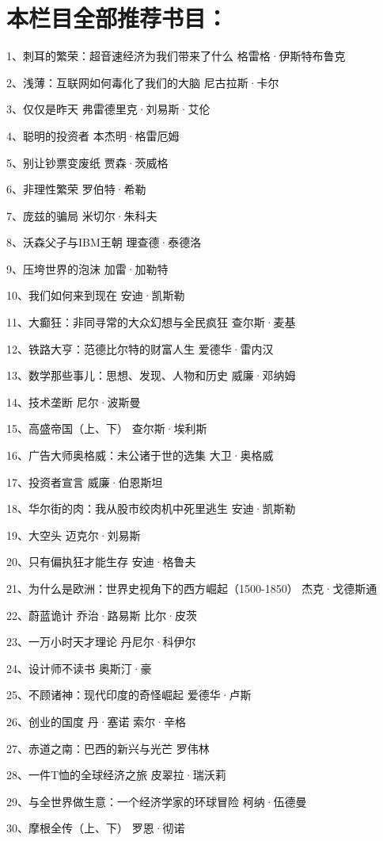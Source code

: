 \section{本栏目全部推荐书目：}

1、刺耳的繁荣：超音速经济为我们带来了什么 格雷格·伊斯特布鲁克

2、浅薄：互联网如何毒化了我们的大脑 尼古拉斯·卡尔

3、仅仅是昨天 弗雷德里克·刘易斯·艾伦

4、聪明的投资者 本杰明·格雷厄姆

5、别让钞票变废纸 贾森·茨威格

6、非理性繁荣 罗伯特·希勒

7、庞兹的骗局 米切尔·朱科夫

8、沃森父子与IBM王朝 理查德·泰德洛

9、压垮世界的泡沫 加雷·加勒特

10、我们如何来到现在 安迪·凯斯勒

11、大癫狂：非同寻常的大众幻想与全民疯狂 查尔斯·麦基

12、铁路大亨：范德比尔特的财富人生 爱德华·雷内汉

13、数学那些事儿：思想、发现、人物和历史 威廉·邓纳姆

14、技术垄断 尼尔·波斯曼

15、高盛帝国（上、下） 查尔斯·埃利斯

16、广告大师奥格威：未公诸于世的选集 大卫·奥格威

17、投资者宣言 威廉·伯恩斯坦

18、华尔街的肉：我从股市绞肉机中死里逃生 安迪·凯斯勒

19、大空头 迈克尔·刘易斯

20、只有偏执狂才能生存 安迪·格鲁夫

21、为什么是欧洲：世界史视角下的西方崛起（1500-1850） 杰克·戈德斯通

22、蔚蓝诡计 乔治·路易斯 比尔·皮茨

23、一万小时天才理论 丹尼尔·科伊尔

24、设计师不读书 奥斯汀·豪

25、不顾诸神：现代印度的奇怪崛起 爱德华·卢斯

26、创业的国度 丹·塞诺 索尔·辛格

27、赤道之南：巴西的新兴与光芒 罗伟林

28、一件T恤的全球经济之旅 皮翠拉·瑞沃莉

29、与全世界做生意：一个经济学家的环球冒险 柯纳·伍德曼

30、摩根全传（上、下） 罗恩·彻诺

